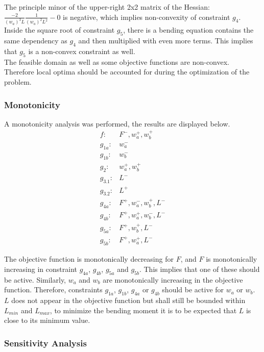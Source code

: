 The principle minor of the upper-right 2x2 matrix of the Hessian: $\frac{-2}{\left( w_a \right)^3 L } \frac{1}{\left( w_a \right)^2 L^2 } - 0 $ is negative, which implies non-convexity of constraint $g_4$.\\

Inside the square root of constraint $g_5$, there is a bending equation contains the same dependency as $g_4$ and then multiplied with even more terms. This implies that $g_5$ is a non-convex constraint as well. \\
The feasible domain as well as some objective functions are non-convex. Therefore local optima should be accounted for during the optimization of the problem.

\subsubsection{Monotonicity}
A monotonicity analysis was performed, the results are displayed below. 
\begin{align*}
	f: & F^-, w_a^+, w_b^+ \\
	g_{1a}:& w_a^- \\
	g_{1b}:& w_b^- \\
	g_{2}:& w_a^+, w_b^+\\
	g_{3.1}:& L^- \\
	g_{3.2}:& L^+ \\
	g_{4a}:& F^+, w_a^-, w_b^+, L^- \\
	g_{4b}:& F^+, w_a^+, w_b^-, L^-\\
	g_{5a}:& F^+, w_b^+, L^-\\
	g_{5b}:& F^+, w_a^+, L^-
\end{align*}

The objective function is monotonically decreasing for $F$, and $F$ is monotonically increasing in constraint $g_{4a}$, $g_{4b}$, $g_{5a}$ and $g_{5b}$. This implies that one of these should be active. Similarly, $w_a$ and $w_b$ are monotonically increasing in the objective function. Therefore, constraints $g_{1a}$, $g_{1b}$, $g_{4a}$ or $g_{4b}$ should be active for $w_a$ or $w_b$. $L$ does not appear in the objective function but shall still be bounded within $L_{min}$ and $L_{max}$, to minimize the bending moment it is to be expected that $L$ is close to its minimum value. 




\subsubsection{Sensitivity Analysis}

